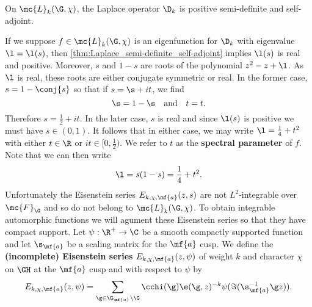     \begin{theorem}\label{thm:Laplace_semi-definite_self-adjoint}
      On $\mc{L}_{k}(\G,\chi)$, the Laplace operator $\D_{k}$ is positive semi-definite and self-adjoint.
    \end{theorem}

    If we suppose $f \in \mc{L}_{k}(\G,\chi)$ is an eigenfunction for $\D_{k}$ with eigenvalue $\l = \l(s)$, then \cref{thm:Laplace_semi-definite_self-adjoint} implies $\l(s)$ is real and positive. Moreover, $s$ and $1-s$ are roots of the polynomial $z^{2}-z+\l$. As $\l$ is real, these roots are either conjugate symmetric or real. In the former case, $s = 1-\conj{s}$ so that if $s = \s+it$, we find
    \[
      \s = 1-\s \quad \text{and} \quad t = t.
    \]
    Therefore $s = \frac{1}{2}+it$. In the later case, $s$ is real and since $\l(s)$ is positive we must have $s \in (0,1)$. It follows that in either case, we may write $\l = \frac{1}{4}+t^{2}$ with either $t \in \R$ or $it \in [0,\frac{1}{2})$. We refer to $t$ as the \textbf{spectral parameter} of $f$. Note that we can then write
    \[
      \l = s(1-s) = \frac{1}{4}+t^{2}.
    \]
    Unfortunately the Eisenstein series $E_{k,\chi,\mf{a}}(z,s)$ are not $L^{2}$-integrable over $\mc{F}_{\G}$ and so do not belong to $\mc{L}_{k}(\G,\chi)$. To obtain integrable automorphic functions we will agument these Eisenstein series so that they have compact support. Let $\psi:\R^{+} \to \C$ be a smooth compactly supported function and let $\s_{\mf{a}}$ be a scaling matrix for the $\mf{a}$ cusp. We define the \textbf{(incomplete) Eisenstein series} $E_{k,\chi,\mf{a}}(z,\psi)$ of weight $k$ and character $\chi$ on $\GH$ at the $\mf{a}$ cusp and with respect to $\psi$ by
    \[
      E_{k,\chi,\mf{a}}(z,\psi) = \sum_{\g \in \G_{\mf{a}}\backslash\G}\cchi(\g)\e(\g,z)^{-k}\psi(\Im(\s_{\mf{a}}^{-1}\g z)).
    \]
